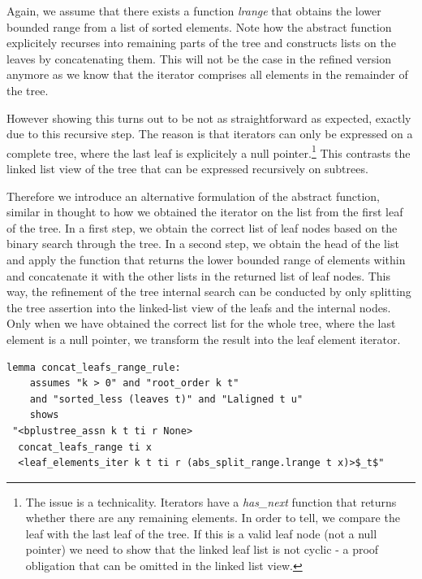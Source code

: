 \documentclass[a4paper,UKenglish,cleveref, autoref, thm-restate]{lipics-v2021}
\begin{document}
Again, we assume that there exists a function \textit{lrange} that
obtains the lower bounded range from a list of sorted elements.
Note how the abstract function explicitely recurses into
remaining parts of the tree and constructs lists on the leaves by concatenating them.
This will not be the case in the refined version anymore
as we know that the iterator comprises all elements in the remainder of the tree.

However showing this turns out to be not as straightforward
as expected, exactly due to this recursive step.
The reason is that iterators can only be expressed on a complete tree,
where the last leaf is explicitely a null pointer.\footnote{
    The issue is a technicality. Iterators have a \textit{has\_next} function
    that returns whether there are any remaining elements.
    In order to tell, we compare the leaf with the last leaf of the tree.
    If this is a valid leaf node (not a null pointer) we need to show
    that the linked leaf list is not cyclic - a proof obligation
    that can be omitted in the linked list view.
}
This contrasts the linked list view of the tree that can be expressed
recursively on subtrees.

Therefore we introduce an alternative formulation of the
abstract function, similar in thought to how we obtained the iterator
on the list from the first leaf of the tree.
In a first step, we obtain the correct list of leaf nodes
based on the binary search through the tree.
In a second step, we obtain the head of the list and apply
the function that returns the lower bounded range of elements within
and concatenate it with the other lists in the returned list of leaf nodes.
This way, the refinement of the tree internal search
can be conducted by only splitting the tree assertion into the linked-list view of the leafs
and the internal nodes.
Only when we have obtained the correct list for the whole tree,
where the last element is a null pointer,
we transform the result into the leaf element iterator.

\begin{lstlisting}[mathescape=true, language=Isabelle,label=lst:btree-leafs-range]
lemma concat_leafs_range_rule:
    assumes "k > 0" and "root_order k t" 
    and "sorted_less (leaves t)" and "Laligned t u"
    shows 
 "<bplustree_assn k t ti r None>
  concat_leafs_range ti x
  <leaf_elements_iter k t ti r (abs_split_range.lrange t x)>$_t$"
\end{lstlisting}

\end{document}
